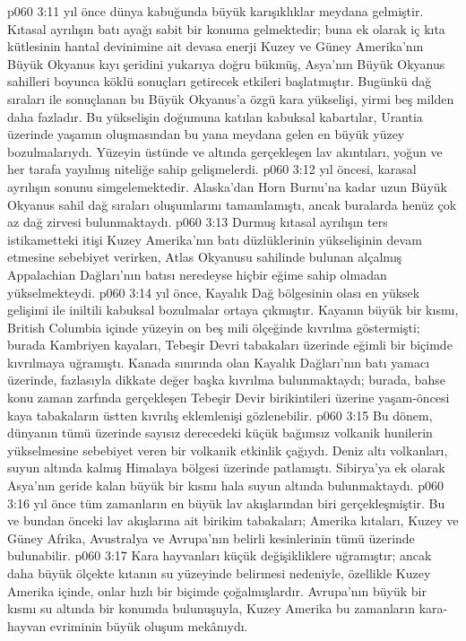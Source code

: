 \vs p060 3:11  yıl önce dünya kabuğunda büyük karışıklıklar meydana gelmiştir. Kıtasal ayrılışın batı ayağı sabit bir konuma gelmektedir; buna ek olarak iç kıta kütlesinin hantal devinimine ait devasa enerji Kuzey ve Güney Amerika’nın Büyük Okyanus kıyı şeridini yukarıya doğru bükmüş, Asya’nın Büyük Okyanus sahilleri boyunca köklü sonuçları getirecek etkileri başlatmıştır. Bugünkü dağ sıraları ile sonuçlanan bu Büyük Okyanus’a özgü kara yükselişi, yirmi beş milden daha fazladır. Bu yükselişin doğumuna katılan kabuksal kabartılar, Urantia üzerinde yaşamın oluşmasından bu yana meydana gelen en büyük yüzey bozulmalarıydı. Yüzeyin üstünde ve altında gerçekleşen lav akıntıları, yoğun ve her tarafa yayılmış niteliğe sahip gelişmelerdi.
\vs p060 3:12  yıl öncesi, karasal ayrılışın sonunu simgelemektedir. Alaska’dan Horn Burnu’na kadar uzun Büyük Okyanus sahil dağ sıraları oluşumlarını tamamlamıştı, ancak buralarda henüz çok az dağ zirvesi bulunmaktaydı.
\vs p060 3:13 Durmuş kıtasal ayrılışın ters istikametteki itişi Kuzey Amerika’nın batı düzlüklerinin yükselişinin devam etmesine sebebiyet verirken, Atlas Okyanusu sahilinde bulunan alçalmış Appalachian Dağları’nın batısı neredeyse hiçbir eğime sahip olmadan yükselmekteydi.
\vs p060 3:14  yıl önce, Kayalık Dağ bölgesinin olası en yüksek gelişimi ile iniltili kabuksal bozulmalar ortaya çıkmıştır. Kayanın büyük bir kısmı, British Columbia içinde yüzeyin on beş mili ölçeğinde kıvrılma göstermişti; burada Kambriyen kayaları, Tebeşir Devri tabakaları üzerinde eğimli bir biçimde kıvrılmaya uğramıştı. Kanada sınırında olan Kayalık Dağları’nın batı yamacı üzerinde, fazlasıyla dikkate değer başka kıvrılma bulunmaktaydı; burada, bahse konu zaman zarfında gerçekleşen Tebeşir Devir birikintileri üzerine yaşam\hyp{}öncesi kaya tabakaların üstten kıvrılış eklemlenişi gözlenebilir.
\vs p060 3:15 Bu dönem, dünyanın tümü üzerinde sayısız derecedeki küçük bağımsız volkanik hunilerin yükselmesine sebebiyet veren bir volkanik etkinlik çağıydı. Deniz altı volkanları, suyun altında kalmış Himalaya bölgesi üzerinde patlamıştı. Sibirya’ya ek olarak Asya’nın geride kalan büyük bir kısmı hala suyun altında bulunmaktaydı.
\vs p060 3:16  yıl önce tüm zamanların en büyük lav akışlarından biri gerçekleşmiştir. Bu ve bundan önceki lav akışlarına ait birikim tabakaları; Amerika kıtaları, Kuzey ve Güney Afrika, Avustralya ve Avrupa’nın belirli kesinlerinin tümü üzerinde bulunabilir.
\vs p060 3:17 Kara hayvanları küçük değişikliklere uğramıştır; ancak daha büyük ölçekte kıtanın su yüzeyinde belirmesi nedeniyle, özellikle Kuzey Amerika içinde, onlar hızlı bir biçimde çoğalmışlardır. Avrupa’nın büyük bir kısmı su altında bir konumda bulunuşuyla, Kuzey Amerika bu zamanların kara\hyp{}hayvan evriminin büyük oluşum mekânıydı.
